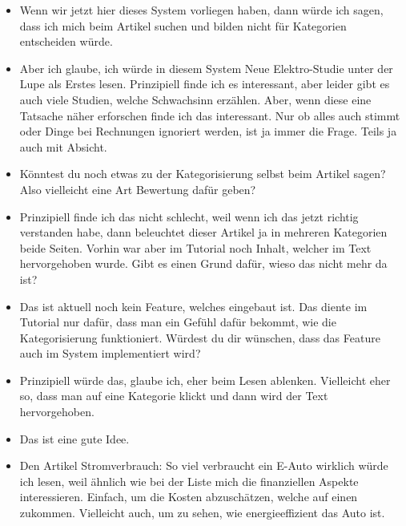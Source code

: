 {\begin{itemize}[]
                  Dann habe ich auch keinen Bock darauf.
                  Aber wenn es gut ist, also Dinge, welche zu mir passen würde ich so ein System bevorzugen.
            \item {} Wenn wir jetzt hier dieses System vorliegen haben, dann würde ich sagen, dass ich mich beim Artikel suchen und bilden nicht für Kategorien entscheiden würde.
            \item {} Aber ich glaube, ich würde in diesem System \flqq Neue Elektro-Studie unter der Lupe\frqq{} als Erstes lesen.
                  Prinzipiell finde ich es interessant, aber leider gibt es auch viele Studien, welche Schwachsinn erzählen.
                  Aber, wenn diese eine Tatsache näher erforschen finde ich das interessant.
                  Nur ob alles auch stimmt oder Dinge bei Rechnungen ignoriert werden, ist ja immer die Frage.
                  Teils ja auch mit Absicht.
            \item {} Könntest du noch etwas zu der Kategorisierung selbst beim Artikel sagen? Also vielleicht eine Art Bewertung dafür geben?
            \item {} Prinzipiell finde ich das nicht schlecht, weil wenn ich das jetzt richtig verstanden habe, dann beleuchtet dieser Artikel ja in mehreren Kategorien beide Seiten.
                  Vorhin war aber im Tutorial noch Inhalt, welcher im Text hervorgehoben wurde. Gibt es einen Grund dafür, wieso das nicht mehr da ist?
            \item {} Das ist aktuell noch kein Feature, welches eingebaut ist.
                  Das diente im Tutorial nur dafür, dass man ein Gefühl dafür bekommt, wie die Kategorisierung funktioniert.
                  Würdest du dir wünschen, dass das Feature auch im System implementiert wird?
            \item {} Prinzipiell würde das, glaube ich, eher beim Lesen ablenken.
                  Vielleicht eher so, dass man auf eine Kategorie klickt und dann wird der Text hervorgehoben.
            \item {} Das ist eine gute Idee.
            \item {} Den Artikel \flqq Stromverbrauch: So viel verbraucht ein E-Auto wirklich\frqq{} würde ich lesen, weil ähnlich wie bei der Liste mich die finanziellen Aspekte interessieren.
                  Einfach, um die Kosten abzuschätzen, welche auf einen zukommen.
                  Vielleicht auch, um zu sehen, wie energieeffizient das Auto ist.

\end{itemize}}
